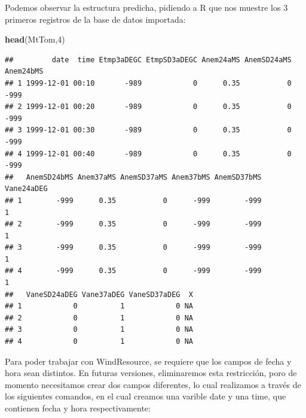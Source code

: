 \documentclass[]{article}
\newenvironment{Shaded}{\begin{snugshade}}{\end{snugshade}}
\newcommand{\KeywordTok}[1]{\textcolor[rgb]{0.13,0.29,0.53}{\textbf{{#1}}}}
\newcommand{\DecValTok}[1]{\textcolor[rgb]{0.00,0.00,0.81}{{#1}}}
\newcommand{\StringTok}[1]{\textcolor[rgb]{0.31,0.60,0.02}{{#1}}}
\newcommand{\NormalTok}[1]{{#1}}
\begin{document}
Podemos observar la estructura predicha, pidiendo a R que nos muestre
los 3 primeros registros de la base de datos importada:

\begin{Shaded}
\begin{Highlighting}[]
\KeywordTok{head}\NormalTok{(MtTom,}\DecValTok{4}\NormalTok{)}
\end{Highlighting}
\end{Shaded}

\begin{verbatim}
##         date  time Etmp3aDEGC EtmpSD3aDEGC Anem24aMS AnemSD24aMS Anem24bMS
## 1 1999-12-01 00:10       -989            0      0.35           0      -999
## 2 1999-12-01 00:20       -989            0      0.35           0      -999
## 3 1999-12-01 00:30       -989            0      0.35           0      -999
## 4 1999-12-01 00:40       -989            0      0.35           0      -999
##   AnemSD24bMS Anem37aMS AnemSD37aMS Anem37bMS AnemSD37bMS Vane24aDEG
## 1        -999      0.35           0      -999        -999          1
## 2        -999      0.35           0      -999        -999          1
## 3        -999      0.35           0      -999        -999          1
## 4        -999      0.35           0      -999        -999          1
##   VaneSD24aDEG Vane37aDEG VaneSD37aDEG  X
## 1            0          1            0 NA
## 2            0          1            0 NA
## 3            0          1            0 NA
## 4            0          1            0 NA
\end{verbatim}

Para poder trabajar con WindResource, se requiere que los campos de
fecha y hora sean distintos. En futuras versiones, eliminaremos esta
restricción, poro de momento necesitamos crear dos campos diferentes, lo
cual realizamos a través de los siguientes comandos, en el cual creamos
una varible date y una time, que contienen fecha y hora respectivamente:

\begin{Shaded}
\end{Shaded}
\end{document}
